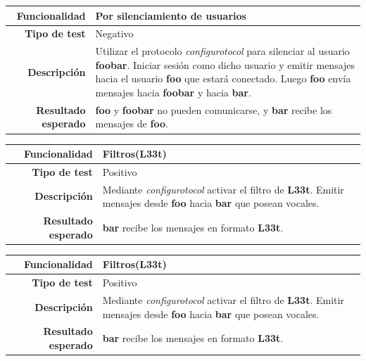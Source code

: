 \documentclass[a4paper,10pt]{article}
\begin{document}
\begin{center}
  \begin{tabular}{|r|p{12.5cm}|}
    \hline
    \textbf{Funcionalidad}	&	Por silenciamiento de usuarios\\
    \hline
    \textbf{Tipo de test}	&	Negativo\\
    \hline
    \textbf{Descripción}	&	Utilizar el protocolo \textit{configurotocol} para silenciar al usuario
					\textbf{foobar}. Iniciar sesión como dicho usuario y emitir mensajes hacia
					el usuario \textbf{foo} que estará conectado.
					Luego \textbf{foo} envía mensajes hacia \textbf{foobar} y hacia \textbf{bar}.\\
    \hline
    \textbf{Resultado esperado}	&	\textbf{foo} y \textbf{foobar} no pueden comunicarse, y \textbf{bar} recibe los mensajes de \textbf{foo}.\\
    \hline   
  \end{tabular}
\end{center}

\begin{center}
  \begin{tabular}{|r|p{12.5cm}|}
    \hline
    \textbf{Funcionalidad}	&	Filtros(L33t)\\
    \hline
    \textbf{Tipo de test}	&	Positivo\\
    \hline
    \textbf{Descripción}	&	Mediante \textit{configurotocol} activar el filtro de \textbf{L33t}. 
					Emitir mensajes desde \textbf{foo} hacia \textbf{bar} que posean vocales.\\
    \hline
    \textbf{Resultado esperado}	&	\textbf{bar} recibe los mensajes en formato \textbf{L33t}.\\
    \hline   
  \end{tabular}
\end{center}

\begin{center}
  \begin{tabular}{|r|p{12.5cm}|}
    \hline
    \textbf{Funcionalidad}	&	Filtros(L33t)\\
    \hline
    \textbf{Tipo de test}	&	Positivo\\
    \hline
    \textbf{Descripción}	&	Mediante \textit{configurotocol} activar el filtro de \textbf{L33t}. 
					Emitir mensajes desde \textbf{foo} hacia \textbf{bar} que posean vocales.\\
    \hline
    \textbf{Resultado esperado}	&	\textbf{bar} recibe los mensajes en formato \textbf{L33t}.\\
    \hline   
  \end{tabular}
\end{center}
\end{document}
